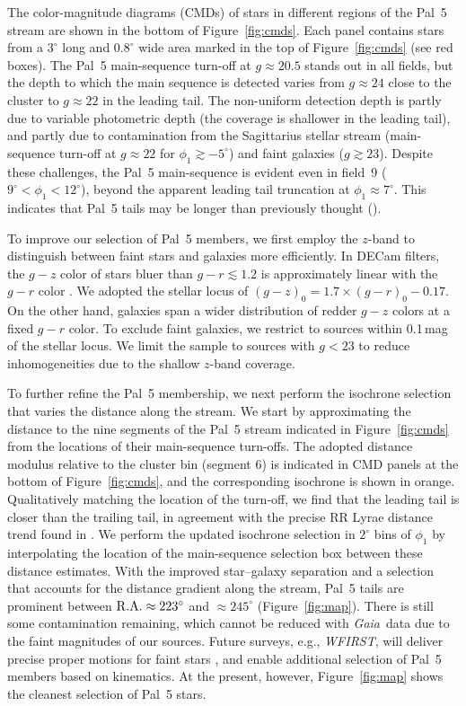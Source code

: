 \documentclass[twocolumn]{aastex62}
\newcommand{\gaia}{\textsl{Gaia}}
\begin{document}
The color-magnitude diagrams (CMDs) of stars in different regions of the Pal~5 stream are shown in the bottom of Figure~\ref{fig:cmds}.
Each panel contains stars from a $3^\circ$ long and $0.8^\circ$ wide area marked in the top of Figure~\ref{fig:cmds} (see red boxes).
The Pal~5 main-sequence turn-off at $g\approx20.5$ stands out in all fields, but the depth to which the main sequence is detected varies from $g\approx24$ close to the cluster to $g\approx22$ in the leading tail.
The non-uniform detection depth is partly due to variable photometric depth (the coverage is shallower in the leading tail), and partly due to contamination from the Sagittarius stellar stream (main-sequence turn-off at $g\approx22$ for $\phi_1\gtrsim-5^\circ$) and faint galaxies ($g\gtrsim23$).
Despite these challenges, the Pal~5 main-sequence is evident even in field~9 ($9^\circ<\phi_1<12^\circ$), beyond the apparent leading tail truncation at $\phi_1\approx7^\circ$.
This indicates that Pal~5 tails may be longer than previously thought (\citealt{Bernard:2016}).

To improve our selection of Pal~5 members, we first employ the $z$-band to distinguish between faint stars and galaxies more efficiently.
In DECam filters, the $g-z$ color of stars bluer than $g-r\lesssim1.2$ is approximately linear with the $g-r$ color \citep[e.g.,][]{dey2019}.
We adopted the stellar locus of $(g-z)_0 = 1.7\times(g-r)_0 -0.17$.
On the other hand, galaxies span a wider distribution of redder $g-z$ colors at a fixed $g-r$ color.
To exclude faint galaxies, we restrict to sources within 0.1\,mag of the stellar locus.
We limit the sample to sources with $g<23$ to reduce inhomogeneities due to the shallow $z$-band coverage.

To further refine the Pal~5 membership, we next perform the isochrone selection that varies the distance along the stream.
We start by approximating the distance to the nine segments of the Pal~5 stream indicated in Figure~\ref{fig:cmds} from the locations of their main-sequence turn-offs.
The adopted distance modulus relative to the cluster bin (segment 6) is indicated in CMD panels at the bottom of Figure~\ref{fig:cmds}, and the corresponding isochrone is shown in orange.
Qualitatively matching the location of the turn-off, we find that the leading tail is closer than the trailing tail, in agreement with the precise RR Lyrae distance trend found in \citet{Price-Whelan:2019}.
We perform the updated isochrone selection in $2^\circ$ bins of $\phi_1$ by interpolating the location of the main-sequence selection box between these distance estimates.
With the improved star--galaxy separation and a selection that accounts for the distance gradient along the stream, Pal~5 tails are prominent between $\rm R.A.\approx223^\circ$ and $\approx245^\circ$ (Figure~\ref{fig:map}).
There is still some contamination remaining, which cannot be reduced with \gaia\ data due to the faint magnitudes of our sources.
Future surveys, e.g., \textsl{WFIRST}, will deliver precise proper motions for faint stars \citep{Sanderson:2017}, and enable additional selection of Pal~5 members based on kinematics.
At the present, however, Figure~\ref{fig:map} shows the cleanest selection of Pal~5 stars.
\end{document}

